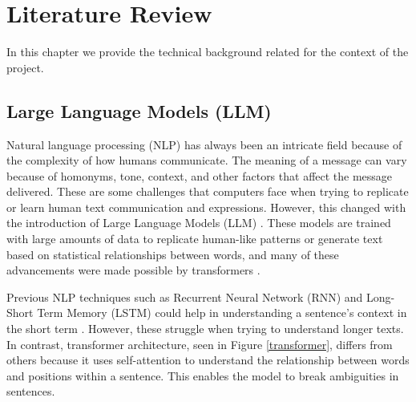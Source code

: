 

\chapter{Literature Review}  

\noindent In this chapter we provide the technical background related for the context of the project.


\section{Large Language Models (LLM)}
Natural language processing (NLP) has always been an intricate field because of the complexity of how humans communicate. The meaning of a message can vary because of homonyms, tone, context, and other factors that affect the message delivered. These are some challenges that computers face when trying to replicate or learn human text communication and expressions.  However, this changed with the introduction of Large Language Models (LLM) \cite{naveed2024comprehensiveoverviewlargelanguage}. These models are trained with large amounts of data to replicate human-like patterns or generate text based on statistical relationships between words, and many of these advancements were made possible by transformers \cite{vaswani2023attentionneed}. 

Previous NLP techniques such as Recurrent Neural Network (RNN) and Long-Short Term Memory (LSTM) could help in understanding a sentence's context in the short term \cite{Sherstinsky_2020}. However, these struggle when trying to understand longer texts. In contrast, transformer architecture, seen in Figure \ref{transformer}, differs from others because it uses self-attention to understand the relationship between words and positions within a sentence. This enables the model to break ambiguities in sentences. 

